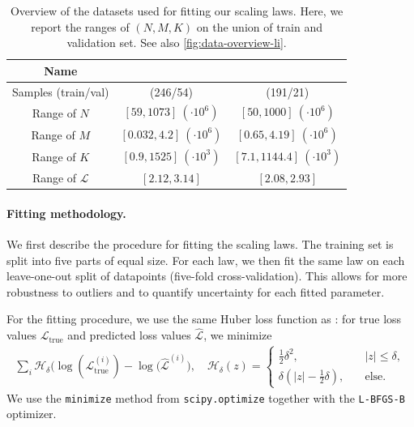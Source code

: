 \begin{table}[H]
    \centering
    \caption{Overview of the datasets used for fitting our scaling laws. Here, we report the ranges of $(N,M,K)$ on the union of train and validation set. See also \cref{fig:data-overview-li}.}
    \begin{tabular}{|c|cc|}
        \hline
        \textbf{Name} & \li{} &  \oellm{} \\[1pt]
        \hline \hline
        Samples (train/val) & (246/54) & (191/21) \\
        Range of $N$ & $[59, 1073] ~(\cdot 10^6)$ & $[50, 1000]~(\cdot 10^6)$ \\
        Range of $M$ & $[0.032,4.2] ~(\cdot 10^6)$ & $[0.65,4.19] ~(\cdot 10^6)$ \\
        Range of $K$ & $[0.9, 1525] ~(\cdot 10^3)$ & $[7.1,1144.4] ~(\cdot 10^3)$ \\
        Range of $\mathcal{L}$ & $[2.12, 3.14]$ & $[2.08,2.93]$ \\
        \hline
    \end{tabular}
    \label{tab:dataset-overview}
\end{table}
%

\paragraph{Fitting methodology.} We first describe the procedure for fitting the scaling laws. The training set is split into five parts of equal size. For each law, we then fit the same law on each leave-one-out split of datapoints (five-fold cross-validation). This allows for more robustness to outliers and to quantify uncertainty for each fitted parameter.

For the fitting procedure, we use the same Huber loss function as \citet{Besiroglu2024}: for true loss values $\mathcal{L}_{\text{true}}$ and predicted loss values $\hat{\mathcal{L}}$, we minimize
\begin{align*}
    \sum_{i} \mathcal{H}_\delta\big(\log(\mathcal{L}^{(i)}_{\text{true}}) - \log(\hat{\mathcal{L}}^{(i)}\big), \quad 
    \mathcal{H}_\delta(z) = \begin{cases}
        \frac12 \delta^2, \quad &|z| \leq \delta, \\
        \delta(|z|-\frac12 \delta), \quad &\text{else}.
    \end{cases}
\end{align*}
We use the \texttt{minimize} method from \texttt{scipy.optimize} together with the \texttt{L-BFGS-B} optimizer.

